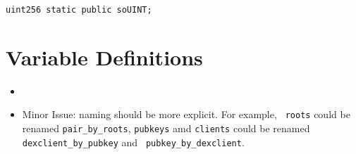\begin{lstlisting}[firstnumber=13]
	uint256 static public soUINT;
\end{lstlisting}

\section{Variable Definitions}

\begin{itemize}
\item \issueGlobal{}
\item Minor Issue: naming should be more explicit. For example, {\tt
  roots} could be renamed {\tt pair\_by\_roots}, {\tt pubkeys} amd
  {\tt clients} could be renamed {\tt dexclient\_by\_pubkey} and {\tt
    pubkey\_by\_dexclient}.
\end{itemize}

